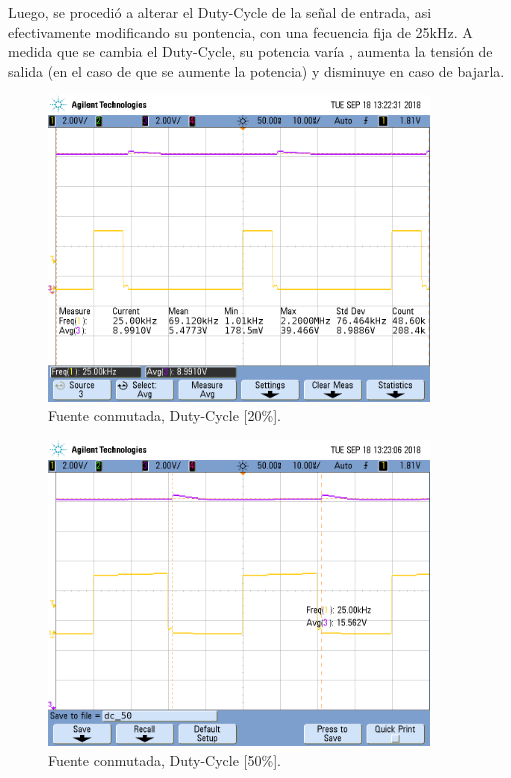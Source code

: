 Luego, se procedió a alterar el Duty-Cycle de la señal de entrada, asi efectivamente modificando su pontencia, con una fecuencia fija de 25kHz.
A medida que se cambia el Duty-Cycle, su potencia varía , aumenta la tensión de salida  (en el caso de que se aumente la potencia) y disminuye en caso de bajarla.
\begin{figure}[H]
	\centering
	\includegraphics[width=0.9\textwidth]{Imagenes/dc_20.png}
\caption{Fuente conmutada, Duty-Cycle [20\%].}
	\label{fig:fcon}
\end{figure}
\begin{figure}[H]
	\centering
	\includegraphics[width=0.9\textwidth]{Imagenes/dc_50.png}
\caption{Fuente conmutada, Duty-Cycle [50\%].}
	\label{fig:fcon}
\end{figure} 
